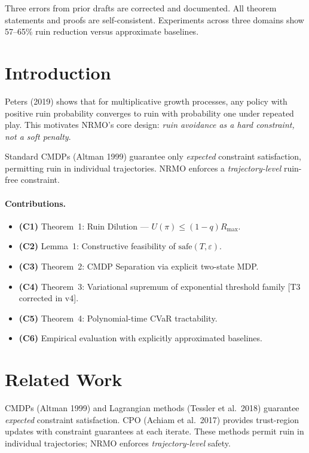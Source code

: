 \noindent
Three errors from prior drafts are corrected and documented. All
theorem statements and proofs are self-consistent. Experiments
across three domains show 57--65\% ruin reduction versus approximate
baselines.

\section{Introduction}
\label{sec:tf-v4-introduction}

Peters (2019) shows that for multiplicative growth processes, any
policy with positive ruin probability converges to ruin with
probability one under repeated play. This motivates NRMO's core
design: \emph{ruin avoidance as a hard constraint, not a soft
penalty}.

Standard CMDPs (Altman 1999) guarantee only \emph{expected}
constraint satisfaction, permitting ruin in individual trajectories.
NRMO enforces a \emph{trajectory-level} ruin-free constraint.

\paragraph{Contributions.}

\begin{itemize}
\item \textbf{(C1)} Theorem~1: Ruin Dilution --- $U(\pi) \le (1 -
q) R_{\max}$.
\item \textbf{(C2)} Lemma~1: Constructive feasibility of
$\mathrm{safe}(T, \varepsilon)$.
\item \textbf{(C3)} Theorem~2: CMDP Separation via explicit
two-state MDP.
\item \textbf{(C4)} Theorem~3: Variational supremum of exponential
threshold family [T3 corrected in v4].
\item \textbf{(C5)} Theorem~4: Polynomial-time CVaR tractability.
\item \textbf{(C6)} Empirical evaluation with explicitly approximated
baselines.
\end{itemize}

\section{Related Work}
\label{sec:tf-v4-related}

CMDPs (Altman 1999) and Lagrangian methods (Tessler et al.~2018)
guarantee \emph{expected} constraint satisfaction. CPO (Achiam et
al.~2017) provides trust-region updates with constraint guarantees
at each iterate. These methods permit ruin in individual
trajectories; NRMO enforces \emph{trajectory-level} safety.

